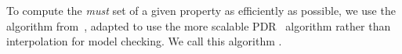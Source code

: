 To compute the \emph{must} set of a given property as efficiently as possible, we use the algorithm from~\cite{chockler2010coverage}, adapted to use the more scalable PDR~\cite{Een2011:PDR} algorithm rather than interpolation for model checking.  We call this algorithm \mustcov.
%
%
%
%
